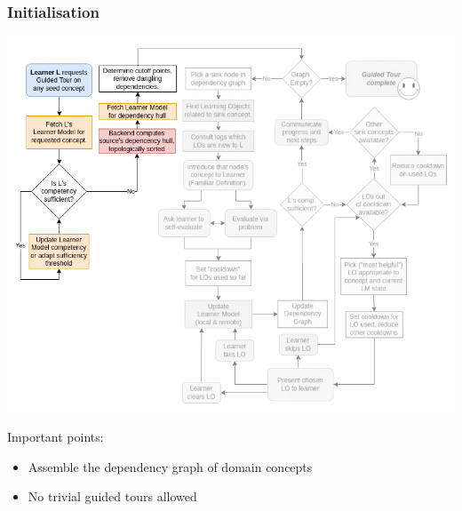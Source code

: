 \documentclass[aspectratio=169, usenames, dvipsnames]{beamer}
\begin{document}
\begin{frame}
\frametitle{Initialisation}
\begin{minipage}{0.7\textwidth}
\vspace*{-10px}
\includegraphics[height=0.9\textheight,keepaspectratio]{images/gt_algorithm_square_step1}
\end{minipage}%
\begin{minipage}{0.3\textwidth}
Important points:
\bigskip
\begin{itemize}
\item Assemble the dependency graph of domain concepts\\
\item No trivial guided tours allowed
\end{itemize}
\end{minipage}%
\end{frame}
\end{document}
